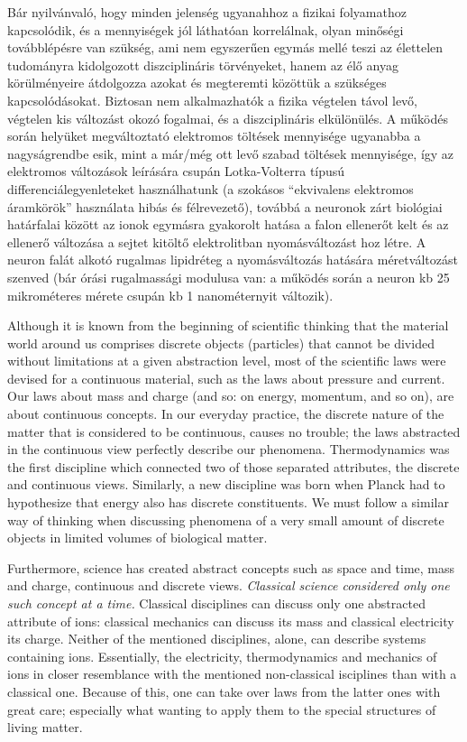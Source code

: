 \else

Bár nyilvánvaló, hogy minden jelenség ugyanahhoz a fizikai folyamathoz kapcsolódik, és a mennyiségek jól láthatóan korrelálnak, olyan minőségi továbblépésre van szükség, ami nem egyszerűen egymás mellé teszi az élettelen tudományra kidolgozott diszciplináris törvényeket, hanem az élő anyag körülményeire átdolgozza azokat és megteremti közöttük a szükséges kapcsolódásokat. Biztosan nem alkalmazhatók a fizika végtelen távol levő, végtelen kis változást okozó fogalmai, és a diszciplináris elkülönülés. A működés során helyüket megváltoztató elektromos töltések mennyisége ugyanabba a nagyságrendbe esik, mint a már/még ott levő szabad töltések mennyisége, így az elektromos változások leírására csupán Lotka-Volterra típusú differenciálegyenleteket használhatunk
 (a szokásos “ekvivalens elektromos áramkörök” használata hibás és félrevezető), továbbá a neuronok zárt biológiai határfalai között az ionok egymásra gyakorolt hatása a falon ellenerőt kelt és az ellenerő változása a sejtet kitöltő elektrolitban nyomásváltozást hoz létre. A neuron falát alkotó rugalmas lipidréteg a nyomásváltozás hatására méretváltozást szenved (bár órási rugalmassági modulusa van: a működés során a neuron kb 25 mikrométeres mérete csupán kb 1 nanométernyit változik). 
\fi

\ifx\magyar\undefined
Although it is known from the beginning of scientific thinking that the material world around us
comprises discrete objects (particles) that cannot be divided without limitations at a given abstraction level,
most of the scientific laws were devised for a continuous material,
such as the laws about pressure and current.
Our laws about mass and charge (and so: on energy, momentum, and so on),
are about continuous concepts.
In our everyday practice, the discrete nature of the matter
that is considered to be continuous, causes no trouble;
the laws abstracted in the continuous view perfectly
describe our phenomena.
Thermodynamics was the first discipline
which connected two of those separated attributes, the discrete and continuous views. Similarly, a new discipline was born when Planck had to hypothesize that energy also has
discrete constituents.
We must follow a similar way of thinking when discussing
phenomena of a very small amount of discrete objects in limited volumes of biological matter.

Furthermore, science has created abstract concepts such as space and time, mass and charge, continuous and discrete views. \textit{Classical science considered only one such concept at a time.}
Classical disciplines can discuss only one abstracted attribute of ions: classical mechanics can discuss its mass
and classical  electricity its charge.
Neither of the mentioned disciplines, alone, can describe systems containing ions.
Essentially, the electricity, thermodynamics and mechanics
of ions in closer resemblance with the mentioned non-classical isciplines than with a classical one.
Because of this, one can take over laws from the latter ones 
with  great care; especially what wanting to apply them to
the special structures of living matter.

